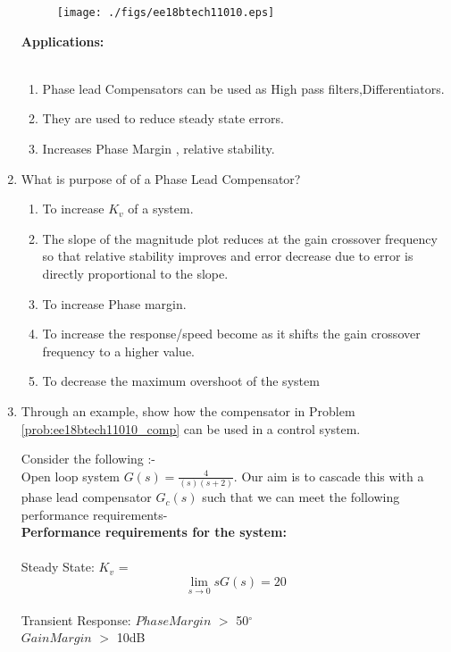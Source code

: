 \begin{enumerate}[label=\thesection.\arabic*.,ref=\thesection.\theenumi]
\begin{figure}[htp]
	\centering
	\texttt{[image: ./figs/ee18btech11010.eps]}
	\caption{}
	\label{fig:ee18btech11010}
\end{figure}
 
\textbf{Applications:}\\ \\
\begin{enumerate}
  \item Phase lead Compensators can be used as High pass filters,Differentiators.
  \item They are used to reduce steady state errors. 
  \item Increases Phase Margin , relative stability.
\end{enumerate}
\item What is purpose of of a Phase Lead Compensator? \\

\solution
 \begin{enumerate}
\item To increase $K_v$ of a system.
\item The slope of the magnitude plot reduces at the gain crossover frequency so that relative stability improves and error decrease due to error is directly proportional to the slope.
\item To increase Phase margin. 
\item To increase the response/speed become as it shifts the gain crossover frequency to a higher value.
\item To decrease the maximum overshoot of the system

\end{enumerate}


\item Through an example, show how the compensator in Problem \ref{prob:ee18btech11010_comp} can be used in a control system. \\
\solution

Consider the following :- \\

 Open loop system $G(s)=\frac{4}{(s)(s+2)}$. Our aim is to cascade this with a phase lead compensator $G_c(s)$ such that we can meet the following performance requirements-  \\

\textbf{Performance requirements for the system:}\\ \\ 
  Steady State:  $K_v$ = \[\lim_{s \to 0} sG(s) = 20 \] \\
  Transient Response: 	$Phase Margin$ $>$ 50$^{\circ}$  \\
			$Gain Margin$ $>$ 10dB \\


\end{enumerate}

